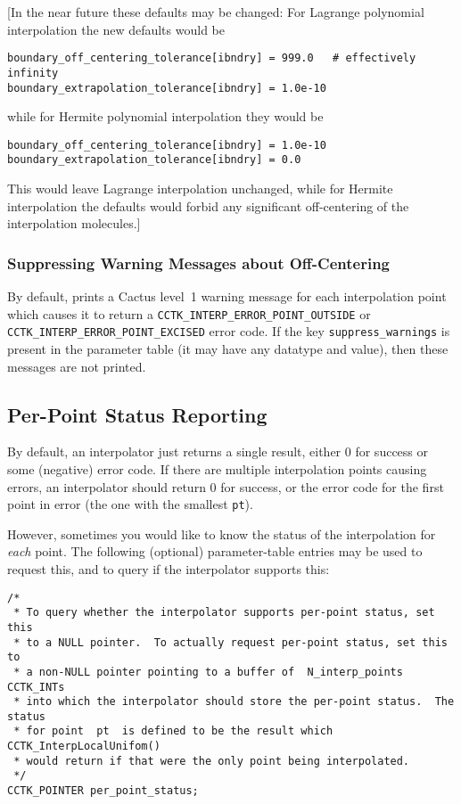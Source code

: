[In the near future these defaults may be changed:  For Lagrange
polynomial interpolation the new defaults would be
\begin{verbatim}
boundary_off_centering_tolerance[ibndry] = 999.0   # effectively infinity
boundary_extrapolation_tolerance[ibndry] = 1.0e-10
\end{verbatim}
while for Hermite polynomial interpolation they would be
\begin{verbatim}
boundary_off_centering_tolerance[ibndry] = 1.0e-10
boundary_extrapolation_tolerance[ibndry] = 0.0
\end{verbatim}
This would leave Lagrange interpolation unchanged, while for Hermite
interpolation the defaults would forbid any significant off-centering
of the interpolation molecules.]


\subsubsection{Suppressing Warning Messages about Off-Centering}

By default,  prints a Cactus level~1 warning
message for each interpolation point which causes it to return a
\verb|CCTK_INTERP_ERROR_POINT_OUTSIDE| or
\verb|CCTK_INTERP_ERROR_POINT_EXCISED| error code.  If the key
\verb|suppress_warnings| is present in the parameter table
(it may have any datatype and value), then these messages are
not printed.


\subsection{Per-Point Status Reporting}

By default, an interpolator just returns a single result, either
0 for success or some (negative) error code.  If there are multiple
interpolation points causing errors, an interpolator should return
0 for success, or the error code for the first point in error
(the one with the smallest \verb|pt|).

However, sometimes you would like to know the status of the interpolation
for {\em each\/} point.  The following (optional) parameter-table entries
may be used to request this, and to query if the interpolator supports this:
\begin{verbatim}
/*
 * To query whether the interpolator supports per-point status, set this
 * to a NULL pointer.  To actually request per-point status, set this to
 * a non-NULL pointer pointing to a buffer of  N_interp_points  CCTK_INTs
 * into which the interpolator should store the per-point status.  The status
 * for point  pt  is defined to be the result which CCTK_InterpLocalUnifom()
 * would return if that were the only point being interpolated.
 */
CCTK_POINTER per_point_status;
\end{verbatim}

